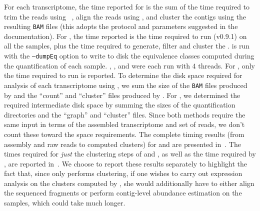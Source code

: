 For each transcriptome, the time reported for \corset is the sum of the time required to trim the reads using \trimmomatic~\citep{trimmomatic}, align the reads using \Bowtie, and cluster the contigs using the resulting \texttt{BAM} files (this adopts the protocol and parameters suggested in the \corset documentation).  For \rapclust, the time reported is the time required to run \sailfish (v0.9.1) on all the samples, plus the time required to generate, filter and cluster the \ambiggraph.  \sailfish is run with the \texttt{--dumpEq} option to write to disk the equivalence classes computed during the quantification of each sample.  \trimmomatic, \Bowtie, and \sailfish were each run with $4$ threads.  For \cdhit, only the time required to run \cdhit is reported.  To determine the disk space required for analysis of each transcriptome using \corset, we sum the size of the \texttt{BAM} files produced by \Bowtie and the ``count'' and ``cluster'' files produced by \corset.  For \rapclust, we determined the required intermediate disk space by summing the sizes of the \sailfish quantification directories and the ``graph'' and ``cluster'' files.  Since both methods require the same input in terms of the assembled transcriptome and set of reads, we don't count these toward the space requirements.  The complete timing results (from assembly and raw reads to computed clusters) for \rapclust and \corset are presented in~.  The times required for \textit{just} the clustering steps of \rapclust and \corset, as well as the time required by \cdhit, are reported in~.  We choose to report these results separately to highlight the fact that, since \cdhit only performs clustering, if one wishes to carry out expression analysis on the clusters computed by \cdhit, she would additionally have to either align the sequenced fragments or perform contig-level abundance estimation on the samples, which could take much longer.



